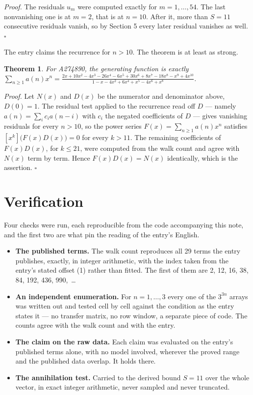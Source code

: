 \documentclass[11pt]{article}
\newtheorem{theorem}{Theorem}
\theoremstyle{definition}
\begin{document}
{\itshape Proof.} The residuals $u_m$ were computed exactly for $m = 1,\dots,54$. The last nonvanishing one is at $m = 2$, that is at $n = 10$. After it, more than $S = 11$ consecutive residuals vanish, so by Section 5 every later residual vanishes as well. $\square$

The entry claims the recurrence for $n > 10$. The theorem is at least as strong.

\begin{theorem} For A274890, the generating function is exactly $\sum_{n\ge 1} a(n)x^n = \frac{2x + 10x^{2} - 4x^{3} - 26x^{4} - 6x^{5} + 30x^{6} + 8x^{7} - 18x^{8} - x^{9} + 4x^{10}}{1 - x - 4x^{2} + 6x^{4} + x^{5} - 4x^{6} + x^{8}}$.\end{theorem}

{\itshape Proof.} Let $N(x)$ and $D(x)$ be the numerator and denominator above, $D(0)=1$. The residual test applied to the recurrence read off $D$ --- namely $a(n) = \sum_i c_i a(n-i)$ with $c_i$ the negated coefficients of $D$ --- gives vanishing residuals for every $n > 10$, so the power series $F(x)=\sum_{n\ge 1}a(n)x^n$ satisfies $[x^k]\bigl(F(x)D(x)\bigr) = 0$ for every $k > 11$. The remaining coefficients of $F(x)D(x)$, for $k \le 21$, were computed from the walk count and agree with $N(x)$ term by term. Hence $F(x)D(x) = N(x)$ identically, which is the assertion. $\square$

\section{Verification}

Four checks were run, each reproducible from the code accompanying this note, and the first two are what pin the reading of the entry's English.

\begin{itemize}

\item {\bfseries The published terms.} The walk count reproduces all 29 terms the entry publishes, exactly, in integer arithmetic, with the index taken from the entry's stated offset (1) rather than fitted. The first of them are 2, 12, 16, 38, 84, 192, 436, 990,~\dots

\item {\bfseries An independent enumeration.} For $n = 1,\dots,3$ every one of the $3^{3n}$ arrays was written out and tested cell by cell against the condition as the entry states it --- no transfer matrix, no row window, a separate piece of code. The counts agree with the walk count and with the entry.

\item {\bfseries The claim on the raw data.} Each claim was evaluated on the entry's published terms alone, with no model involved, wherever the proved range and the published data overlap. It holds there.

\item {\bfseries The annihilation test.} Carried to the derived bound $S = 11$ over the whole vector, in exact integer arithmetic, never sampled and never truncated.

\end{itemize}
\end{document}
